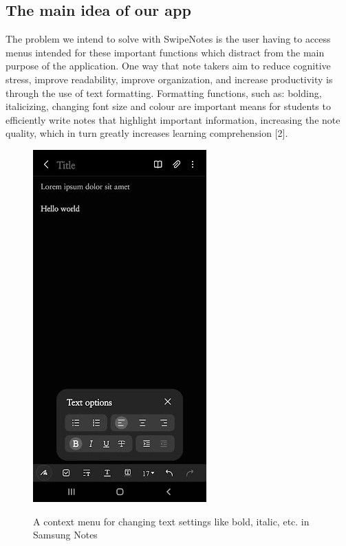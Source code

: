 \documentclass[conference]{IEEEtran}
\begin{document}
\subsection{The main idea of our app}
The problem we intend to solve with SwipeNotes is the user having to access menus intended for these important functions which distract from the main purpose of the application. One way that note takers aim to reduce cognitive stress, improve readability, improve organization, and increase productivity is through the use of text formatting. Formatting functions, such as: bolding, italicizing, changing font size and colour are important means for students to efficiently write notes that highlight important information, increasing the note quality, which in turn greatly increases learning comprehension [2].\\
\begin{figure}[ht]
    \centering
    \includegraphics[scale=0.6]{images/textmenu.jpg}\\
    \caption{A context menu for changing text settings like bold, italic, etc. in Samsung Notes}
    \label{fig:enter-label}
\end{figure}
\end{document}
